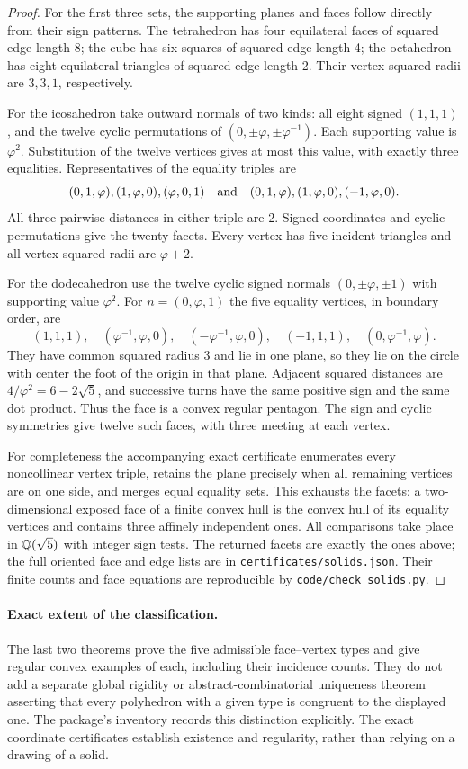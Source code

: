 \begin{proof}
For the first three sets, the supporting planes and faces follow directly
from their sign patterns. The tetrahedron has four equilateral faces
of squared edge length 8; the cube has six squares of squared edge
length 4; the octahedron has eight equilateral triangles of squared
edge length 2. Their vertex squared radii are $3,3,1$, respectively.

For the icosahedron take outward normals of two kinds: all eight signed
$(1,1,1)$, and the twelve cyclic permutations of
$(0,\pm\varphi,\pm\varphi^{-1})$. Each supporting value is
$\varphi^2$. Substitution of the twelve vertices gives at most this
value, with exactly three equalities. Representatives of the equality
triples are
\[
 (0,1,\varphi),(1,\varphi,0),(\varphi,0,1)
\quad\hbox{and}\quad
 (0,1,\varphi),(1,\varphi,0),(-1,\varphi,0).
\]
All three pairwise distances in either triple are 2. Signed coordinates
and cyclic permutations give the twenty facets. Every vertex has five
incident triangles and all vertex squared radii are $\varphi+2$.

For the dodecahedron use the twelve cyclic signed normals
$(0,\pm\varphi,\pm1)$ with supporting value $\varphi^2$.
For $n=(0,\varphi,1)$ the five equality vertices, in boundary order, are
\[
 (1,1,1),\quad (\varphi^{-1},\varphi,0),\quad
 (-\varphi^{-1},\varphi,0),\quad (-1,1,1),\quad
 (0,\varphi^{-1},\varphi).
\]
They have common squared radius 3 and lie in one plane, so they lie
on the circle with center the foot of the origin in that plane.
Adjacent squared distances are $4/\varphi^2=6-2\sqrt5$, and
successive turns have the same positive sign and the same dot product.
Thus the face is a convex regular pentagon. The sign and cyclic
symmetries give twelve such faces, with three meeting at each vertex.

For completeness the accompanying exact certificate enumerates every
noncollinear vertex triple, retains the plane precisely when all remaining
vertices are on one side, and merges equal equality sets. This exhausts
the facets: a two-dimensional exposed face of a finite convex hull is
the convex hull of its equality vertices and contains three affinely
independent ones. All comparisons take place in $\mathbb Q(\sqrt5)$ with
integer sign tests. The returned facets are exactly the ones above;
the full oriented face and edge lists are in
\texttt{certificates/solids.json}. Their finite counts and face equations
are reproducible by \texttt{code/check\_solids.py}.
\end{proof}

\paragraph{Exact extent of the classification.}
The last two theorems prove the five admissible face--vertex types and
give regular convex examples of each, including their incidence counts.
They do not add a separate global rigidity or abstract-combinatorial
uniqueness theorem asserting that every polyhedron with a given type is
congruent to the displayed one. The package's inventory records this
distinction explicitly. The exact coordinate certificates establish
existence and regularity, rather than relying on a drawing of a solid.
